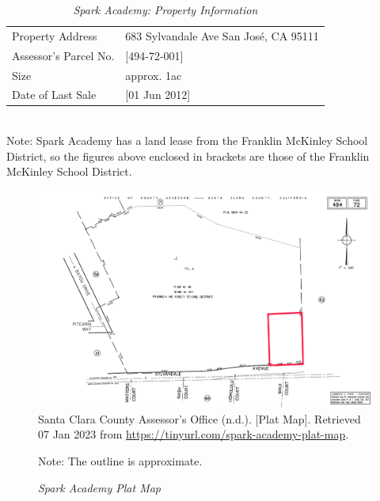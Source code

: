 \begin{table}[htbp]
  \SingleSpacing%
  \caption[Spark Academy: Property Information]{\textit{Spark Academy: Property Information}}\label{tab:spark-academy-prop-info}
  \begin{tabular}{ll}
    \toprule
    Property Address      & 683 Sylvandale Ave San José, CA 95111 \\
    Assessor's Parcel No. & [494-72-001] \\
    Size                  & approx. 1ac \\
    Date of Last Sale     & [01 Jun 2012]\\
    \bottomrule
  \end{tabular}\\
  \noindent\footnotesize{Note: Spark Academy has a land lease from the Franklin McKinley School District, so the figures above enclosed in brackets are those of the Franklin McKinley School District.}  
\end{table}

\begin{figure}[hbtp]
    \caption[Spark Academy Plat Map]{\textit{Spark Academy Plat Map}}\label{fig:spark-academy-plat-map}
    \includegraphics[width=\textwidth]{Assessor-Info/spark-academy-plat-map-494-72}\\ %
    \footnotesize{Santa Clara County Assessor's Office (n.d.). [Plat Map]. Retrieved 07 Jan 2023 from  \url{https://tinyurl.com/spark-academy-plat-map}}.
    
    \noindent\footnotesize{Note: The outline is approximate.}
  \end{figure}

